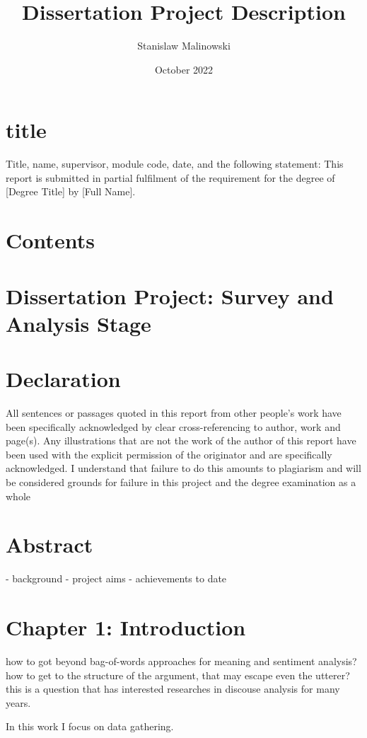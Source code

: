 \documentclass{article}
\title{Dissertation Project Description}
\author{Stanislaw Malinowski}
\date{October 2022}
\begin{document}
\maketitle
\section{title}
Title, name, supervisor, module code, date,
and the following statement: This report is submitted in partial fulfilment of the requirement for the degree of [Degree Title] by [Full Name].

\section*{Contents}
\tableofcontents
\newpage

\section{Dissertation Project: Survey and Analysis Stage}


\section{Declaration}
All sentences or passages quoted in this report from other people's work have been specifically acknowledged by clear cross-referencing to author, work and page(s). Any illustrations that are not the work of the author of this report have been used with the explicit permission of the originator and are specifically acknowledged. I understand that failure to do this amounts to plagiarism and will be considered grounds for failure in this project and the degree examination as a whole

\newpage

\section{Abstract}
- background
- project aims
- achievements to date

\section{Chapter 1: Introduction}
how to got beyond bag-of-words approaches for meaning and sentiment analysis? how to get to the structure of the argument, that may escape even the utterer?
this is a question that has interested researches in discouse analysis for many years.

In this work I focus on data gathering.
\end{document}
